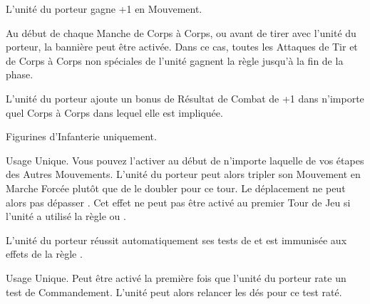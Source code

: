 L'unité du porteur gagne +1 en Mouvement.

Au début de chaque Manche de Corps à Corps, ou avant de tirer avec l'unité du porteur, la bannière peut être activée. Dans ce cas, toutes les Attaques de Tir et de Corps à Corps non spéciales de l'unité gagnent la règle \flamingattacks{} jusqu'à la fin de la phase.

\columnbreak

L'unité du porteur ajoute un bonus de Résultat de Combat de +1 dans n'importe quel Corps à Corps dans lequel elle est impliquée.

Figurines d'Infanterie uniquement.

Usage Unique. Vous pouvez l'activer au début de n'importe laquelle de vos étapes des Autres Mouvements. L'unité du porteur peut alors tripler son Mouvement en Marche Forcée plutôt que de le doubler pour ce tour. Le déplacement ne peut alors pas dépasser . Cet effet ne peut pas être activé au premier Tour de Jeu si l'unité a utilisé la règle \vanguard{} ou \scout{}.

L'unité du porteur réussit automatiquement ses tests de \terror{} et est immunisée aux effets de la règle \fear{}.

Usage Unique. Peut être activé la première fois que l'unité du porteur rate un test de Commandement. L'unité peut alors relancer les dés pour ce test raté.

\endpricelist
